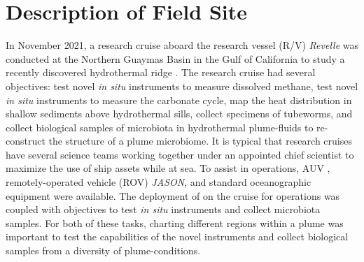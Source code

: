 \section{Description of Field Site}
In November 2021, a research cruise aboard the research vessel (R/V) \emph{Revelle} was conducted at the Northern Guaymas Basin in the Gulf of California to study a recently discovered hydrothermal ridge \autocite{soule2018exploration, geilert2018formation}. The research cruise had several objectives: test novel \emph{in situ} instruments to measure dissolved methane, test novel \emph{in situ} instruments to measure the carbonate cycle, map the heat distribution in shallow sediments above hydrothermal sills, collect specimens of tubeworms, and collect biological samples of microbiota in hydrothermal plume-fluids to re-construct the structure of a plume microbiome. It is typical that research cruises have several science teams working together under an appointed chief scientist to maximize the use of ship assets while at sea. To assist in operations, AUV \Sentry, remotely-operated vehicle (ROV) \emph{JASON}, and standard oceanographic equipment were available. The deployment of \PHORTEX on the cruise for \Sentry operations was coupled with objectives to test \emph{in situ} instruments and collect microbiota samples. For both of these tasks, charting different regions within a plume was important to test the capabilities of the novel instruments and collect biological samples from a diversity of plume-conditions.


